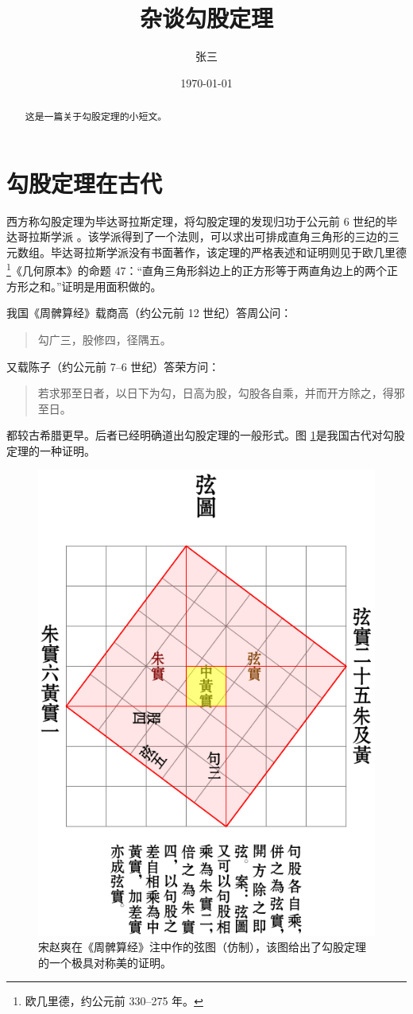 \documentclass[UTF8]{ctexart}
\title{杂谈勾股定理}
\author{张三}
\date{\today}
\begin{document}
\maketitle
\begin{abstract}
这是一篇关于勾股定理的小短文。
\end{abstract}
\tableofcontents
\section{勾股定理在古代}
西方称勾股定理为毕达哥拉斯定理，将勾股定理的发现归功于公元前 6 世纪的毕达哥拉斯学派 \cite{Kline}。该学派得到了一个法则，可以求出可排成直角三角形的三边的三元数组。毕达哥拉斯学派没有书面著作，该定理的严格表述和证明则见于欧几里德\footnote{欧几里德，约公元前 330--275 年。}《几何原本》的命题 47：“直角三角形斜边上的正方形等于两直角边上的两个正方形之和。”证明是用面积做的。

我国《周髀算经》载商高（约公元前 12 世纪）答周公问：
\begin{quote}
\kaishu 勾广三，股修四，径隅五。
\end{quote}
又载陈子（约公元前 7--6 世纪）答荣方问：
\begin{quote}
若求邪至日者，以日下为勾，日高为股，勾股各自乘，并而开方除之，得邪至日。
\end{quote}
都较古希腊更早。后者已经明确道出勾股定理的一般形式。图 \ref{fig:xiantu}是我国古代对勾股定理的一种证明\cite{quanjing}。
\begin{figure}
   \centering
   \includegraphics[scale=0.6]{res/xiantu.pdf}
   \caption{宋赵爽在《周髀算经》注中作的弦图（仿制），该图给出了勾股定理的一个极具对称美的证明。}
   \label{fig:xiantu}
\end{figure}
\end{document}
